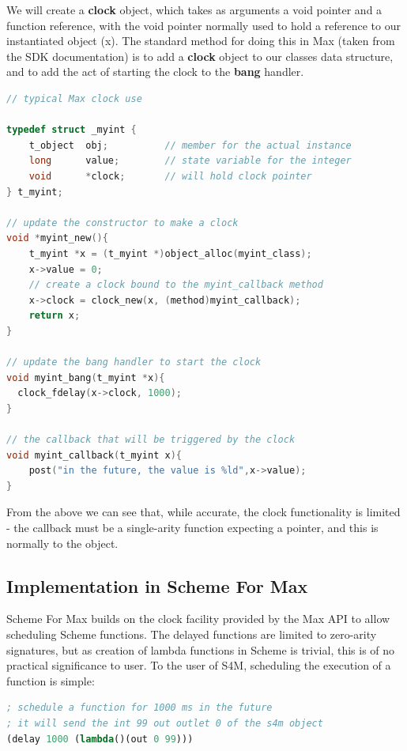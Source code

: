 \documentclass[acmsmall]{acmart}
\begin{document}
We will create a \textbf{clock} object, which takes as arguments a void pointer and a function
reference, with the void pointer normally used to hold a reference to our instantiated
object (x). The standard method for doing this in Max (taken from the SDK documentation)
is to add a \textbf{clock} object to our classes data structure, and to add the act
of starting the clock to the \textbf{bang} handler.

\begin{lstlisting}[language=C]
// typical Max clock use

typedef struct _myint {
    t_object  obj;          // member for the actual instance 
    long      value;        // state variable for the integer
    void      *clock;       // will hold clock pointer
} t_myint;

// update the constructor to make a clock
void *myint_new(){
    t_myint *x = (t_myint *)object_alloc(myint_class);
    x->value = 0;
    // create a clock bound to the myint_callback method
    x->clock = clock_new(x, (method)myint_callback); 
    return x;
}

// update the bang handler to start the clock
void myint_bang(t_myint *x){
  clock_fdelay(x->clock, 1000);
}

// the callback that will be triggered by the clock
void myint_callback(t_myint x){
    post("in the future, the value is %ld",x->value);
}
\end{lstlisting}


From the above we can see that, while accurate, the clock functionality is limited -
the callback must be a single-arity function expecting a pointer, and this
is normally to the object.


\subsection{Implementation in Scheme For Max}

Scheme For Max builds on the clock facility provided by the Max API to allow scheduling
Scheme functions. The delayed functions are limited to zero-arity signatures, but as
creation of lambda functions in Scheme is trivial, this is of no practical significance to 
user. To the user of S4M, scheduling the execution of a function is simple:

\begin{lstlisting}[language=lisp]
; schedule a function for 1000 ms in the future
; it will send the int 99 out outlet 0 of the s4m object
(delay 1000 (lambda()(out 0 99)))
\end{lstlisting}
\end{document}
